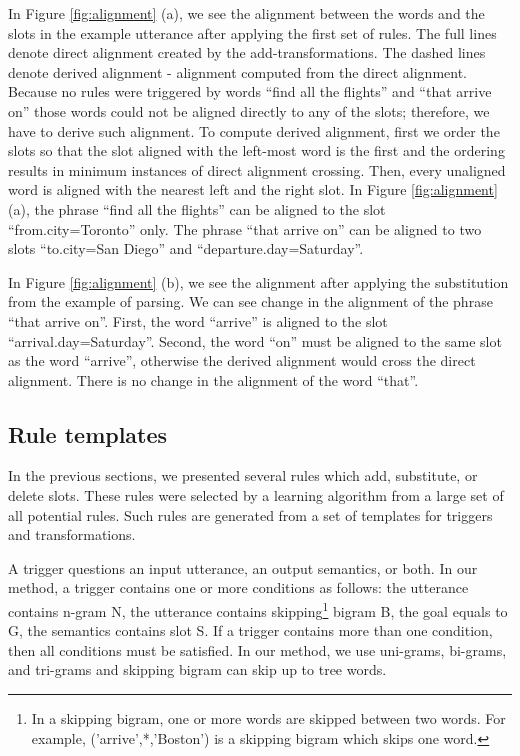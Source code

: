 \documentclass{article}
\begin{document}

In Figure \ref{fig:alignment} (a), we see the alignment between the words and the slots in the example utterance after applying the first set of rules. The full lines denote direct alignment created by the add-transformations. The dashed lines denote derived alignment - alignment computed from the direct alignment. Because no rules were triggered by words ``find all the flights'' and ``that arrive on'' those words could not be aligned directly to any of the slots; therefore, we have to derive such alignment. To compute derived alignment, first we order the slots so that the slot aligned with the left-most word is the first and the ordering results in minimum instances of direct alignment crossing. Then, every unaligned word is aligned with the nearest left and the right slot. In Figure \ref{fig:alignment} (a), the phrase ``find all the flights'' can be aligned to the slot ``from.city=Toronto'' only. The phrase ``that arrive on'' can be aligned to two slots ``to.city=San Diego'' and ``departure.day=Saturday''.

In Figure \ref{fig:alignment} (b), we see the alignment after applying the substitution from the example of parsing. We can see change in the alignment of the phrase ``that arrive on''. First, the word ``arrive'' is aligned to the slot ``arrival.day=Saturday''. Second, the word ``on'' must be aligned to the same slot as the word ``arrive'', otherwise the derived alignment would cross the direct alignment. There is no change in the alignment of the word ``that''.

\subsection{Rule templates}
In the previous sections, we presented several rules which add, substitute, or delete slots. These rules were selected by a learning algorithm from a large set of all potential rules. Such rules are generated from a set of templates for triggers and transformations. 

A trigger 
questions an input utterance, an output semantics, or both. In our method, a trigger contains one or more conditions as follows: the utterance contains n-gram N, the utterance contains skipping\footnote{In a skipping bigram, one or more words are skipped between two words. For example, ('arrive',*,'Boston') is a skipping bigram which skips one word.} bigram B, the goal equals to G, the semantics contains slot S. If a trigger contains more than one condition, then all conditions must be satisfied. In our method, we use uni-grams, bi-grams, and tri-grams and skipping bigram can skip up to tree words.
\end{document}
